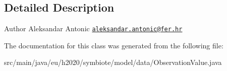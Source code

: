 \subsection{Detailed Description}
\begin{DoxyAuthor}{Author}
Aleksandar Antonic \href{mailto:aleksandar.antonic@fer.hr}{\tt aleksandar.\+antonic@fer.\+hr} 
\end{DoxyAuthor}


The documentation for this class was generated from the following file\+:\begin{DoxyCompactItemize}
\item 
src/main/java/eu/h2020/symbiote/model/data/Observation\+Value.\+java\end{DoxyCompactItemize}
